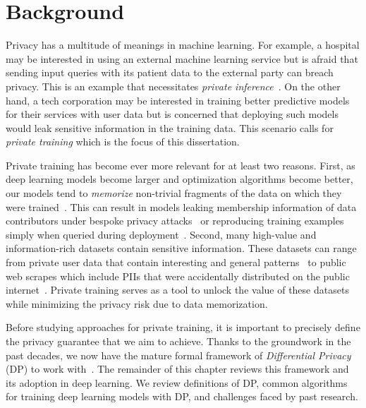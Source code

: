 \chapter{Background}\label{ch_2}

Privacy has a multitude of meanings in machine learning.
For example, a hospital may be interested in using an external machine learning service but is afraid that sending input queries with its patient data to the external party can breach privacy.
This is an example that necessitates \emph{private inference}~\citep{tramer2018slalom,h100_confidential_computing}.
On the other hand, a tech corporation may be interested in training better predictive models for their services with user data but is concerned that deploying such models would leak sensitive information in the training data.
This scenario calls for \emph{private training} which is the focus of this dissertation.

Private training has become ever more relevant for at least two reasons. 
First, as deep learning models become larger and optimization algorithms become better, our models tend to \emph{memorize} non-trivial fragments of the data on which they were trained~\citep{DBLP:journals/corr/ZhangBHRV16,feldman2020neural,feldman2020does,brown2021memorization}.
This can result in models leaking membership information of data contributors under bespoke privacy attacks~\citep{shokri2017membership} or reproducing training examples simply when queried during deployment~\citep{carlini2020extracting,nasr2023scalable}.
Second, many high-value and information-rich datasets contain sensitive information.
These datasets can range from private user data that contain interesting and general patterns~\citep{google-2019} to public web scrapes which include PIIs that were accidentally distributed on the public internet~\citep{carlini2020extracting}.
Private training serves as a tool to unlock the value of these datasets while minimizing the privacy risk due to data memorization.

Before studying approaches for private training, it is important to precisely define the privacy guarantee that we aim to achieve.
Thanks to the groundwork in the past decades, we now have the mature formal framework of \emph{Differential Privacy} (DP) to work with~\citep{dwork2006calibrating,dwork2014algorithmic}.
The remainder of this chapter reviews this framework and its adoption in deep learning.
We review definitions of DP, common algorithms for training deep learning models with DP, and challenges faced by past research.

